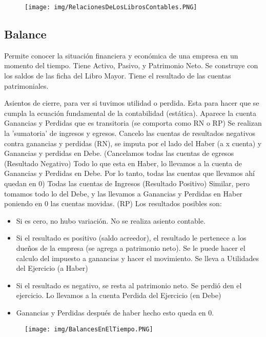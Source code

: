 \documentclass[titlepage,a4paper]{article}
\begin{document}
\begin{figure}[!htb]
    \centering
    \texttt{[image: img/RelacionesDeLosLibrosContables.PNG]}
\end{figure}

\newpage

\subsection{Balance}
Permite conocer la situación financiera y económica de una empresa en un momento del tiempo. Tiene Activo, Pasivo, y Patrimonio Neto. Se construye con los saldos de las ficha del Libro Mayor. Tiene el resultado de las cuentas patrimoniales.


Asientos de cierre, para ver si tuvimos utilidad o perdida. Esta para hacer que se cumpla la ecuación fundamental de la contabilidad (estática). Aparece la cuenta Ganancias y Perdidas que es transitoria (se comporta como RN o RP) Se realizan la 'sumatoria' de ingresos y egresos.
Cancelo las cuentas de resultados negativos contra ganancias y perdidas (RN), se imputa por el lado del Haber (a x cuenta) y Ganancias y perdidas en Debe.
(Cancelamos todas las cuentas de egresos (Resultado Negativo) Todo lo que esta en Haber, lo llevamos a la cuenta de Ganancias y Perdidas en Debe. Por lo tanto, todas las cuentas que llevamos ahí quedan en 0)
Todas las cuentas de Ingresos (Resultado Positivo) Similar, pero tomamos todo lo del Debe, y las llevamos a Ganancias y Perdidas en Haber poniendo en 0 las cuentas movidas. (RP)
Los resultados posibles son:
\begin{itemize}
\item Si es cero, no hubo variación. No se realiza asiento contable.
\item Si el resultado es positivo (saldo acreedor), el resultado le pertenece a los dueños de la empresa (se agrega a patrimonio neto). Se le puede hacer el calculo del impuesto a ganancias y hacer el movimiento. Se lleva a Utilidades del Ejercicio (a Haber)
\item Si el resultado es negativo, se resta al patrimonio neto. Se perdió den el ejercicio. Lo llevamos a la cuenta Perdida del Ejercicio (en Debe)
\item Ganancias y Perdidas después de haber hecho esto queda en 0.
\end{itemize}

\begin{figure}[!htb]
    \centering
    \texttt{[image: img/BalancesEnElTiempo.PNG]}
\end{figure}
\end{document}

